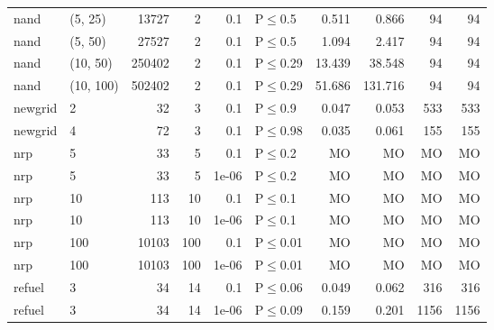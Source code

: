 \begin{longtable}{llrrrlrrrr}
 nand          & (5, 25)   &  	13727 &   2 & 0.1   & P$\leq$0.5   & 0.511   & 0.866   & 94    & 94    \\
 nand          & (5, 50)   &  	27527 &   2 & 0.1   & P$\leq$0.5   & 1.094   & 2.417   & 94    & 94    \\
 nand          & (10, 50)  & 	250402 &   2 & 0.1   & P$\leq$0.29  & 13.439  & 38.548  & 94    & 94    \\
 nand          & (10, 100) & 	502402 &   2 & 0.1   & P$\leq$0.29  & 51.686  & 131.716 & 94    & 94    \\
 newgrid       & 2         &     	32 &   3 & 0.1   & P$\leq$0.9   & 0.047   & 0.053   & 533   & 533   \\
 newgrid       & 4         &     	72 &   3 & 0.1   & P$\leq$0.98  & 0.035   & 0.061   & 155   & 155   \\
 nrp           & 5         &     	33 &   5 & 0.1   & P$\leq$0.2   & MO      & MO      & MO    & MO    \\
 nrp           & 5         &     	33 &   5 & 1e-06 & P$\leq$0.2   & MO      & MO      & MO    & MO    \\
 nrp           & 10        &    	113 &  10 & 0.1   & P$\leq$0.1   & MO      & MO      & MO    & MO    \\
 nrp           & 10        &    	113 &  10 & 1e-06 & P$\leq$0.1   & MO      & MO      & MO    & MO    \\
 nrp           & 100       &  	10103 & 100 & 0.1   & P$\leq$0.01  & MO      & MO      & MO    & MO    \\
 nrp           & 100       &  	10103 & 100 & 1e-06 & P$\leq$0.01  & MO      & MO      & MO    & MO    \\
 refuel        & 3         &     	34 &  14 & 0.1   & P$\leq$0.06  & 0.049   & 0.062   & 316   & 316   \\
 refuel        & 3         &     	34 &  14 & 1e-06 & P$\leq$0.09  & 0.159   & 0.201   & 1156  & 1156  \\
\bottomrule
\end{longtable}
